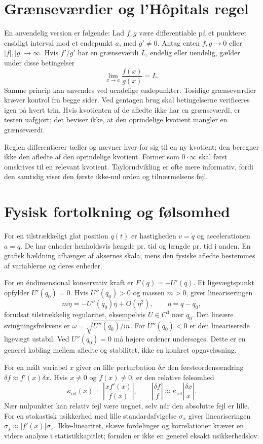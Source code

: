 \section{Grænseværdier og l'Hôpitals regel}
\label{sec:hopital}
En anvendelig version er følgende: Lad $f,g$ være differentiable på et punkteret ensidigt interval mod et endepunkt $a$, med $g'\ne0$. Antag enten $f,g\to0$ eller $|f|,|g|\to\infty$. Hvis $f'/g'$ har en grænseværdi $L$, endelig eller uendelig, gælder under disse betingelser
\[
 \lim_{x\to a}\frac{f(x)}{g(x)}=L.
\]
Samme princip kan anvendes ved uendelige endepunkter. Tosidige grænseværdier kræver kontrol fra begge sider. Ved gentagen brug skal betingelserne verificeres igen på hvert trin. Hvis kvotienten af de afledte ikke har en grænseværdi, er testen uafgjort; det beviser ikke, at den oprindelige kvotient mangler en grænseværdi.

Reglen differentierer tæller og nævner hver for sig til en ny kvotient; den beregner ikke den afledte af den oprindelige kvotient. Former som $0\cdot\infty$ skal først omskrives til en relevant kvotient. Taylorudvikling er ofte mere informativ, fordi den samtidig viser den første ikke-nul orden og tilnærmelsens fejl.

\section{Fysisk fortolkning og følsomhed}
\label{sec:fysik}
For en tilstrækkeligt glat position $q(t)$ er hastigheden $v=\dot q$ og accelerationen $a=\ddot q$. De har enheder henholdsvis længde pr. tid og længde pr. tid i anden. En grafisk hældning afhænger af aksernes skala, mens den fysiske afledte bestemmes af variablerne og deres enheder.

For en éndimensional konservativ kraft er $F(q)=-U'(q)$. Et ligevægtspunkt opfylder $U'(q_0)=0$. Hvis $U''(q_0)>0$ og massen $m>0$, giver lineariseringen
\[
 m\ddot\eta=-U''(q_0)\eta+O(\eta^2),\qquad \eta=q-q_0,
\]
forudsat tilstrækkelig regularitet, eksempelvis $U\in C^3$ nær $q_0$. Den lineære svingningsfrekvens er $\omega=\sqrt{U''(q_0)/m}$. For $U''(q_0)<0$ er den lineariserede ligevægt ustabil. Ved $U''(q_0)=0$ må højere ordener undersøges. Dette er en generel kobling mellem afledte og stabilitet, ikke en konkret opgaveløsning.

For en målt variabel $x$ giver en lille perturbation $\delta x$ den førsteordensændring $\delta f\approx f'(x)\delta x$. Hvis $x\ne0$ og $f(x)\ne0$, er den relative følsomhed
\[
 \kappa_{\mathrm{rel}}(x)=\left|\frac{x f'(x)}{f(x)}\right|,\qquad
 \left|\frac{\delta f}{f}\right|\approx\kappa_{\mathrm{rel}}\left|\frac{\delta x}{x}\right|.
\]
Nær nulpunkter kan relativ fejl være uegnet, selv når den absolutte fejl er lille. For en stokastisk usikkerhed med lille standardafvigelse $\sigma_x$ giver lineariseringen $\sigma_f\approx|f'(x)|\sigma_x$. Ikke-linearitet, skæve fordelinger og korrelationer kræver en videre analyse i statistikkapitlet; formlen er ikke en generel eksakt usikkerhedslov.

